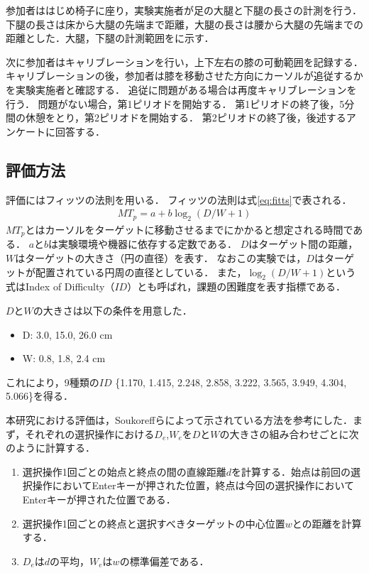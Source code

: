 \documentclass[submit, techrep]{ipsj}
\begin{document}
参加者ははじめ椅子に座り，実験実施者が足の大腿と下腿の長さの計測を行う．下腿の長さは床から大腿の先端まで距離，大腿の長さは腰から大腿の先端までの距離とした．大腿，下腿の計測範囲をに示す．

次に参加者はキャリブレーションを行い，上下左右の膝の可動範囲を記録する．
キャリブレーションの後，参加者は膝を移動させた方向にカーソルが追従するかを実験実施者と確認する．
追従に問題がある場合は再度キャリブレーションを行う．
問題がない場合，第1ピリオドを開始する．
第1ピリオドの終了後，5分間の休憩をとり，第2ピリオドを開始する．
第2ピリオドの終了後，後述するアンケートに回答する．



\subsection{評価方法}
評価にはフィッツの法則\cite{fitts}を用いる．
フィッツの法則は式\ref{eq:fitts}で表される．
\begin{eqnarray}
	MT_p = a + b\log_2{(D/W + 1)}
	\label{eq:fitts}
\end{eqnarray}
$MT_p$とはカーソルをターゲットに移動させるまでにかかると想定される時間である．
$a$と$b$は実験環境や機器に依存する定数である．
$D$はターゲット間の距離，$W$はターゲットの大きさ（円の直径）を表す．
なおこの実験では，$D$はターゲットが配置されている円周の直径としている．
また，$\log_2{(D/W + 1)}$という式はIndex of Difficulty（$ID$）とも呼ばれ，課題の困難度を表す指標である．\par
$D$と$W$の大きさは以下の条件を用意した．
\begin{itemize}
	\item {D: } 3.0, 15.0, 26.0 \si{cm}
	\item {W: } 0.8, 1.8, 2.4 \si{cm}
\end{itemize}
これにより，9種類の$ID$ \{1.170, 1.415, 2.248, 2.858, 3.222, 3.565, 3.949, 4.304, 5.066\}を得る．\par
本研究における評価は，Soukoreffら\cite{Soukoreff:2004:TSP:1056153.1056155}によって示されている方法を参考にした．まず，それぞれの選択操作における$D_e$,$W_e$を$D$と$W$の大きさの組み合わせごとに次のように計算する．
\begin{enumerate}
	\item 選択操作1回ごとの始点と終点の間の直線距離$d$を計算する．始点は前回の選択操作においてEnterキーが押された位置，終点は今回の選択操作においてEnterキーが押された位置である．
	\item 選択操作1回ごとの終点と選択すべきターゲットの中心位置$w$との距離を計算する．
	\item $D_e$は$d$の平均，$W_e$は$w$の標準偏差である．
\end{enumerate}
\end{document}
